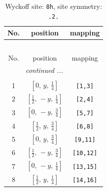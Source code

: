 \documentclass[fleqn,8pt]{jsarticle}
\begin{document}
\begin{longtable}{ccc}
\caption{Wyckoff site: {\tt 8h}, site symmetry: {\tt .2.}}
 \\
 \hline \hline
No. & position & mapping \\ \hline \endfirsthead

\multicolumn{2}{l}{\tablename\ \thetable{}} \\
 \hline \hline
No. & position & mapping \\ \hline \endhead

 \hline \hline
\multicolumn{2}{r}{\footnotesize\it continued ...} \\ \endfoot

 \hline \hline
\multicolumn{2}{r}{} \\ \endlastfoot

1 & $\left[ 0,\, y,\, \frac{1}{4} \right]$ & {\tt [1,3]} \\ \hline
2 & $\left[ \frac{1}{2},\, - y,\, \frac{1}{4} \right]$ & {\tt [2,4]} \\ \hline
3 & $\left[ 0,\, - y,\, \frac{3}{4} \right]$ & {\tt [5,7]} \\ \hline
4 & $\left[ \frac{1}{2},\, y,\, \frac{3}{4} \right]$ & {\tt [6,8]} \\ \hline
5 & $\left[ 0,\, y,\, \frac{3}{4} \right]$ & {\tt [9,11]} \\ \hline
6 & $\left[ \frac{1}{2},\, - y,\, \frac{3}{4} \right]$ & {\tt [10,12]} \\ \hline
7 & $\left[ 0,\, - y,\, \frac{1}{4} \right]$ & {\tt [13,15]} \\ \hline
8 & $\left[ \frac{1}{2},\, y,\, \frac{1}{4} \right]$ & {\tt [14,16]} \\
\end{longtable}
\renewcommand{\arraystretch}{1.2}
\end{document}
